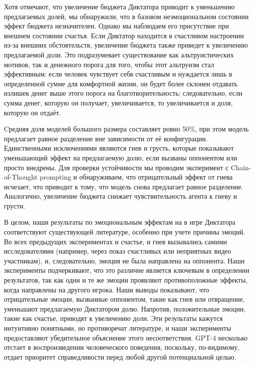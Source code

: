 Хотя \cite{LARNEY201961} отмечают, что увеличение бюджета Диктатора приводит к уменьшению предлагаемых долей, мы обнаружили, что в базовом неэмоциональном состоянии эффект бюджета незначителен. Однако мы наблюдаем его присутствие при внешнем состоянии счастья. Если Диктатор находится в счастливом настроении из-за внешних обстоятельств, увеличение бюджета также приведет к увеличению предлагаемой доли. Это подразумевает существование как альтруистических мотивов, так и денежного порога для того, чтобы этот альтруизм стал эффективным: если человек чувствует себя счастливым и нуждается лишь в определенной сумме для комфортной жизни, он будет более склонен отдавать излишек денег выше этого порога на благотворительность; следовательно, если сумма денег, которую он получает, увеличивается, то увеличивается и доля, которую он отдаёт.

Cредняя доля моделей большого размера составляет ровно 50\%, при этом модель предлагает равное разделение вне зависимости от её конфигурации. Единственными исключениями являются гнев и грусть, которые показывают уменьшающий эффект на предлагаемую долю, если вызваны оппонентом или просто внедрены. Для проверки устойчивости мы проводим эксперимент с Chain-of-Thought prompting и обнаруживаем, что отрицательный эффект от гнева исчезает, что приводит к тому, что модель снова предлагает равное разделение. Аналогично, увеличение бюджета снижает чувствительность агента к гневу и грусти.

В целом, наши результаты по эмоциональным эффектам на в игре Диктатора соответствуют существующей литературе, особенно при учете причины эмоций. Во всех предыдущих экспериментах и счастье, и гнев вызывались самими исследователями (например, через показ счастливых или неприятных видео участникам), и, следовательно, эмоция не была направлена на оппонента. Наши эксперименты подчеркивают, что это различие является ключевым в определении результатов, так как одни и те же эмоции проявляют противоположные эффекты, когда направлены на другого игрока. Наши выводы показывают, что отрицательные эмоции, вызванные оппонентом, такие как гнев или отвращение, уменьшают предлагаемую Диктатором долю. Напротив, положительные эмоции, такие как счастье, приводят к увеличению доли. Эти результаты кажутся интуитивно понятными, но противоречат литературе, и наши эксперименты предоставляют убедительное объяснение этого несоответствия. GPT-4 несколько отстает в воспроизведении человеческого поведения, поскольку, по-видимому, отдает приоритет справедливости перед любой другой потенциальной целью.

